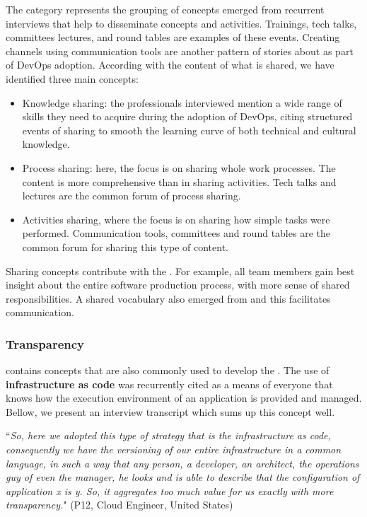 The  category represents the grouping of concepts
emerged from recurrent interviews that help to disseminate concepts and
activities. Trainings, tech talks, committees lectures, and round tables
are examples of these events. Creating 
channels using communication tools are another pattern of
stories about  as part of DevOps adoption.
According with the content of what is shared, we
have identified three main concepts:

\begin{itemize}
\item Knowledge sharing: the professionals interviewed mention a wide range of
skills they need to acquire during the adoption of DevOps, citing
structured events of sharing to smooth the learning curve of both technical and
cultural knowledge.

\item Process sharing: here, the focus is on sharing whole work processes. The
content is more comprehensive than in sharing activities. Tech talks and
lectures are the common forum of process sharing.

\item Activities sharing, where the focus is on sharing how simple tasks were
performed. Communication tools, committees and round tables are the common
forum for sharing this type of content.
\end{itemize}

Sharing concepts contribute with the . For example,
all team members gain best insight about the entire software production
process, with more sense of shared responsibilities. A shared vocabulary also
emerged from  and this facilitates communication.

\subsubsection*{Transparency}

 contains concepts that are also commonly used to develop the
. The use of \textbf{infrastructure as code} was
recurrently cited as a means of everyone that knows how the execution environment of
an application is provided and managed. Bellow, we present an interview
transcript which sums up this concept well.

\begin{mq}
``\emph{So, here we adopted this type of strategy that is the infrastructure as code,
consequently we have the versioning of our entire infrastructure in a common
language, in such a way that any person, a developer, an architect, the
operations guy of even the manager, he looks and is able to describe that the
configuration of application x is y. So, it aggregates too much value for us
exactly with more transparency.}" (P12, Cloud Engineer, United States)
\end{mq}

